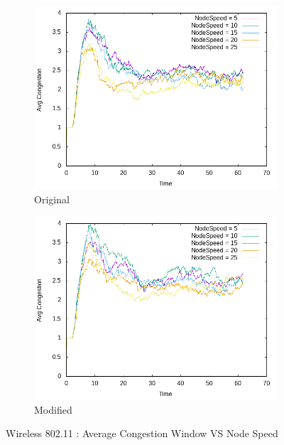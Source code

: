     \begin{figure}[!h] 
    	\centering
    	
    	\begin{subfigure}{0.9\textwidth} %
    		\includegraphics[width=.98\textwidth]{Pictures/Wireless802.11Mobile/Original/Avg_CongestionVSNodeSpeed.png}
    		 \caption{Original} %
    	\end{subfigure}
    	
    	\vspace{1em} %
    	
    	\begin{subfigure}{0.9\textwidth} %
    		\includegraphics[width=.98\textwidth]{Pictures/Wireless802.11Mobile/Modified/Avg_CongestionVSNodeSpeed.png}
    		 \caption{ Modified} %
    	\end{subfigure}
    	
    	 \caption{Wireless 802.11 : Average Congestion Window VS Node Speed} %
    \end{figure}

